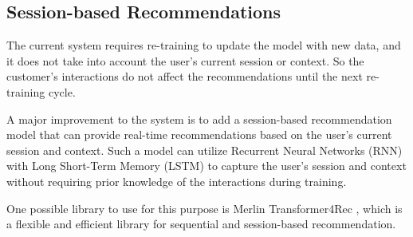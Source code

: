 \subsection{Session-based Recommendations}

The current system requires re-training to update the model with new data, and it does not take into account the user's current session or context.
So the customer's interactions do not affect the recommendations until the next re-training cycle.

A major improvement to the system is to add a session-based recommendation model that can provide real-time recommendations based on the user's current session and context.
Such a model can utilize Recurrent Neural Networks (RNN) with Long Short-Term Memory (LSTM) to capture the user's session and context without requiring prior knowledge of the interactions during training. 

One possible library to use for this purpose is Merlin Transformer4Rec \cite{NvidiaMerlinTransformers4Rec}, 
which is a flexible and efficient library for sequential and session-based recommendation.\cite{NvidiaMerlinTransformers4Rec}

